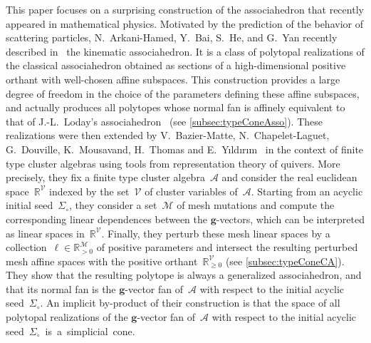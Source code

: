 \documentclass{amsart}
\theoremstyle{definition}
\newcommand{\R}{\mathbb{R}} %
\newcommand{\cal}[1]{{\mathcal{#1}}} %
\renewcommand{\b}[1]{{\boldsymbol{#1}}} %
\newcommand{\seed}{\Sigma} %
\begin{document}
This paper focuses on a surprising construction of the associahedron that recently appeared in mathematical physics.
Motivated by the prediction of the behavior of scattering particles, N.~Arkani-Hamed, Y.~Bai, S.~He, and G.~Yan recently described in~\cite[Sect.~3.2]{ArkaniHamedBaiHeYan} the kinematic associahedron.
It is a class of polytopal realizations of the classical associahedron obtained as sections of a high-dimensional positive orthant with well-chosen affine subspaces.
This construction provides a large degree of freedom in the choice of the parameters defining these affine subspaces, and actually produces all polytopes whose normal fan is affinely equivalent to that of J.-L.~Loday's associahedron~\cite{Loday} (see \cref{subsec:typeConeAsso}).
These realizations were then extended by V.~Bazier-Matte, N.~Chapelet-Laguet, G.~Douville, K.~Mousavand, H.~Thomas and E.~Y\i ld\i r\i m~\cite{BazierMatteChapelierLaguetDouvilleMousavandThomasYildirim} in the context of finite type cluster algebras using tools from representation theory of quivers.
More precisely, they fix a finite type cluster algebra~$\cal{A}$ and consider the real euclidean space~$\R^\cal{V}$ indexed by the set~$\cal{V}$ of cluster variables of~$\cal{A}$.
Starting from an acyclic initial seed~$\seed_\circ$, they consider a set~$\cal{M}$ of mesh mutations and compute the corresponding linear dependences between the $\b{g}$-vectors, which can be interpreted as linear spaces in~$\R^\cal{V}$.
Finally, they perturb these mesh linear spaces by a collection~$\b{\ell} \in \R_{>0}^{\cal{M}}$ of positive parameters and intersect the resulting perturbed mesh affine spaces with the positive orthant~$\R_{\ge 0}^\cal{V}$ (see \cref{subsec:typeConeCA}).
They show that the resulting polytope is always a generalized associahedron, and that its normal fan is the $\b{g}$-vector fan of~$\cal{A}$ with respect to the initial acyclic seed~$\seed_\circ$.
An implicit by-product of their construction is that the space of all polytopal realizations of the $\b{g}$-vector fan of~$\cal{A}$ with respect to the initial acyclic \mbox{seed~$\seed_\circ$ is a simplicial cone}.
\end{document}
